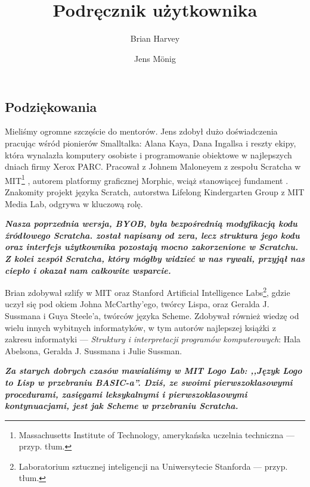 \documentclass{report}
\begin{document}
\title{\Snap{} \\ Podręcznik użytkownika}
\author{Brian Harvey \and Jens M\"{o}nig}
\date{}

\maketitle

\tableofcontents

\chapter*{}
\section*{Podziękowania}

Mieliśmy ogromne szczęście do mentorów. Jens zdobył dużo doświadczenia pracując wśród pionierów Smalltalka: Alana Kaya, Dana Ingallsa i reszty ekipy, która wynalazła komputery osobiste i programowanie obiektowe w najlepszych dniach firmy Xerox PARC. Pracował z Johnem Maloneyem z zespołu Scratcha w MIT\footnote{Massachusetts Institute of Technology, amerykańska uczelnia techniczna --- przyp. tłum.} , autorem platformy graficznej Morphic, wciąż stanowiącej fundament . Znakomity projekt języka Scratch, autorstwa Lifelong Kindergarten Group z MIT Media Lab, odgrywa w  kluczową rolę.

{\bf\em Nasza poprzednia wersja, BYOB, była bezpośrednią modyfikacją kodu źródłowego Scratcha. \Snap{} został napisany od zera, lecz struktura jego kodu oraz interfejs użytkownika pozostają mocno zakorzenione w Scratchu. Z kolei zespół Scratcha, który mógłby widzieć w nas rywali, przyjął nas ciepło i okazał nam całkowite wsparcie.}

Brian zdobywał szlify w MIT oraz Stanford Artificial Intelligence Labs\footnote{Laboratorium sztucznej inteligencji na Uniwersytecie Stanforda --- przyp. tłum.}, gdzie uczył się pod okiem Johna McCarthy'ego, twórcy Lispa, oraz Geralda J. Suss\-mana i Guya Steele'a, twórców języka Scheme. Zdobywał również wiedzę od wielu innych wybitnych informatyków, w tym autorów najlepszej książki z zakresu informatyki --- \emph{Struktury i interpretacji programów komputerowych}: Hala Abelsona, Geralda J. Suss\-mana i Julie Suss\-man.

{\bf\em Za starych dobrych czasów mawialiśmy w MIT Logo Lab: ,,Język Logo to Lisp w przebraniu BASIC-a''. Dziś, ze swoimi pierwszoklasowymi procedurami, zasięgami leksykalnymi i pierwszoklasowymi kontynuacjami, \Snap{} jest jak Scheme w przebraniu Scratcha.}
\end{document}
